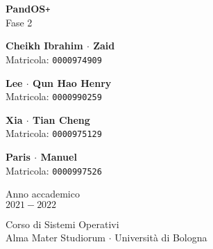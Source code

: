 \documentclass[11pt]{article}
\begin{document}
\graphicspath{ {./img/} }
\begin{titlepage}
    \begin{center}
        \vspace*{1.5cm}
            
        \Huge
        \textbf{PandOS}\texttt{+} \\
        \LARGE
        Fase 2
                        
        \vspace{2.0cm}
          
        \begin{minipage}[t]{0.47\textwidth}
        \begin{center}
        	{\large{\bf Cheikh Ibrahim $\cdot$ Zaid}}\\
			{\large Matricola: \texttt{0000974909}}
        \end{center}

		\end{minipage}
		\hfill
		\begin{minipage}[t]{0.47\textwidth}\raggedleft
		\begin{center}
        	{\large{\bf Lee $\cdot$ Qun Hao Henry}}\\
			{\large Matricola: \texttt{0000990259}}
        \end{center}
		\end{minipage}

        \vspace{1cm}

        \begin{minipage}[t]{0.47\textwidth}
            \begin{center}
                {\large{\bf Xia $\cdot$ Tian Cheng}}\\
                {\large Matricola: \texttt{0000975129}}
            \end{center}
    
            \end{minipage}
            \hfill
            \begin{minipage}[t]{0.47\textwidth}\raggedleft
            \begin{center}
                {\large{\bf Paris $\cdot$ Manuel}}\\
                {\large Matricola: \texttt{0000997526}}
            \end{center}
            \end{minipage}  
            
        \vspace{6cm}
            
        Anno	 accademico\\
        $2021 - 2022$
            
        \vspace{0.8cm}
            
            
        \Large
        Corso di Sistemi Operativi\\
        Alma Mater Studiorum $\cdot$ Università di Bologna\\
            
    \end{center}
\end{titlepage}
\pagebreak
\end{document}
